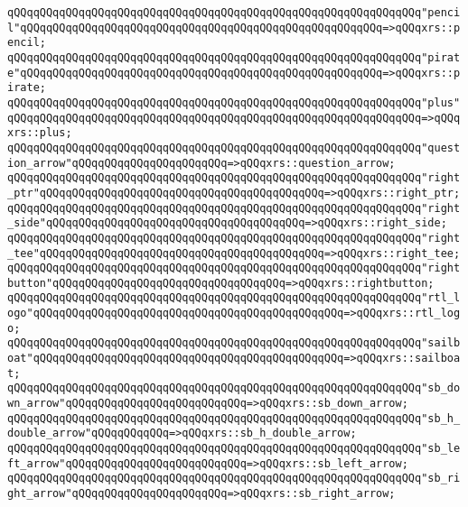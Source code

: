 \verb|qQQqqQQqqQQqqQQqqQQqqQQqqQQqqQQqqQQqqQQqqQQqqQQqqQQqqQQqqQQqqQQq"pencil"qQQqqQQqqQQqqQQqqQQqqQQqqQQqqQQqqQQqqQQqqQQqqQQqqQQqqQQq=>qQQqxrs::pencil;|\newline
\verb|qQQqqQQqqQQqqQQqqQQqqQQqqQQqqQQqqQQqqQQqqQQqqQQqqQQqqQQqqQQqqQQq"pirate"qQQqqQQqqQQqqQQqqQQqqQQqqQQqqQQqqQQqqQQqqQQqqQQqqQQqqQQq=>qQQqxrs::pirate;|\newline
\verb|qQQqqQQqqQQqqQQqqQQqqQQqqQQqqQQqqQQqqQQqqQQqqQQqqQQqqQQqqQQqqQQq"plus"qQQqqQQqqQQqqQQqqQQqqQQqqQQqqQQqqQQqqQQqqQQqqQQqqQQqqQQqqQQqqQQq=>qQQqxrs::plus;|\newline
\verb|qQQqqQQqqQQqqQQqqQQqqQQqqQQqqQQqqQQqqQQqqQQqqQQqqQQqqQQqqQQqqQQq"question_arrow"qQQqqQQqqQQqqQQqqQQqqQQq=>qQQqxrs::question_arrow;|\newline
\verb|qQQqqQQqqQQqqQQqqQQqqQQqqQQqqQQqqQQqqQQqqQQqqQQqqQQqqQQqqQQqqQQq"right_ptr"qQQqqQQqqQQqqQQqqQQqqQQqqQQqqQQqqQQqqQQqqQQq=>qQQqxrs::right_ptr;|\newline
\verb|qQQqqQQqqQQqqQQqqQQqqQQqqQQqqQQqqQQqqQQqqQQqqQQqqQQqqQQqqQQqqQQq"right_side"qQQqqQQqqQQqqQQqqQQqqQQqqQQqqQQqqQQqqQQq=>qQQqxrs::right_side;|\newline
\verb|qQQqqQQqqQQqqQQqqQQqqQQqqQQqqQQqqQQqqQQqqQQqqQQqqQQqqQQqqQQqqQQq"right_tee"qQQqqQQqqQQqqQQqqQQqqQQqqQQqqQQqqQQqqQQqqQQq=>qQQqxrs::right_tee;|\newline
\verb|qQQqqQQqqQQqqQQqqQQqqQQqqQQqqQQqqQQqqQQqqQQqqQQqqQQqqQQqqQQqqQQq"rightbutton"qQQqqQQqqQQqqQQqqQQqqQQqqQQqqQQqqQQq=>qQQqxrs::rightbutton;|\newline
\verb|qQQqqQQqqQQqqQQqqQQqqQQqqQQqqQQqqQQqqQQqqQQqqQQqqQQqqQQqqQQqqQQq"rtl_logo"qQQqqQQqqQQqqQQqqQQqqQQqqQQqqQQqqQQqqQQqqQQqqQQq=>qQQqxrs::rtl_logo;|\newline
\verb|qQQqqQQqqQQqqQQqqQQqqQQqqQQqqQQqqQQqqQQqqQQqqQQqqQQqqQQqqQQqqQQq"sailboat"qQQqqQQqqQQqqQQqqQQqqQQqqQQqqQQqqQQqqQQqqQQqqQQq=>qQQqxrs::sailboat;|\newline
\verb|qQQqqQQqqQQqqQQqqQQqqQQqqQQqqQQqqQQqqQQqqQQqqQQqqQQqqQQqqQQqqQQq"sb_down_arrow"qQQqqQQqqQQqqQQqqQQqqQQqqQQq=>qQQqxrs::sb_down_arrow;|\newline
\verb|qQQqqQQqqQQqqQQqqQQqqQQqqQQqqQQqqQQqqQQqqQQqqQQqqQQqqQQqqQQqqQQq"sb_h_double_arrow"qQQqqQQqqQQq=>qQQqxrs::sb_h_double_arrow;|\newline
\verb|qQQqqQQqqQQqqQQqqQQqqQQqqQQqqQQqqQQqqQQqqQQqqQQqqQQqqQQqqQQqqQQq"sb_left_arrow"qQQqqQQqqQQqqQQqqQQqqQQqqQQq=>qQQqxrs::sb_left_arrow;|\newline
\verb|qQQqqQQqqQQqqQQqqQQqqQQqqQQqqQQqqQQqqQQqqQQqqQQqqQQqqQQqqQQqqQQq"sb_right_arrow"qQQqqQQqqQQqqQQqqQQqqQQq=>qQQqxrs::sb_right_arrow;|\newline
